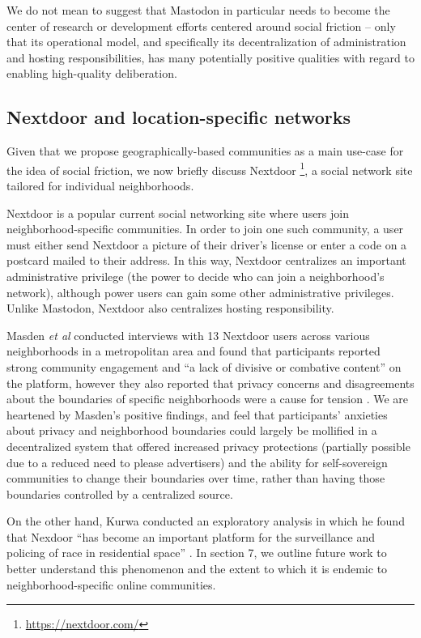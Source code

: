 \documentclass[sigconf,authordraft]{acmart}
\begin{document}
We do not mean to suggest that Mastodon in particular needs to become the center of research or development efforts centered around social friction -- only that its operational model, and specifically its decentralization of administration and hosting responsibilities, has many potentially positive qualities with regard to enabling high-quality deliberation.

\subsection{Nextdoor and location-specific networks}

Given that we propose geographically-based communities as a main use-case for the idea of social friction, we now briefly discuss Nextdoor \footnote{\url{https://nextdoor.com/}}, a social network site tailored for individual neighborhoods.

Nextdoor is a popular current social networking site where users join neighborhood-specific communities. In order to join one such community, a user must either send Nextdoor a picture of their driver's license or enter a code on a postcard mailed to their address. In this way, Nextdoor centralizes an important administrative privilege (the power to decide who can join a neighborhood's network), although power users can gain some other administrative privileges. Unlike Mastodon, Nextdoor also centralizes hosting responsibility.

Masden {\itshape et al} conducted interviews with 13 Nextdoor users across various neighborhoods in a metropolitan area and found that participants reported strong community engagement and ``a lack of divisive or combative content'' on the platform, however they also reported that privacy concerns and disagreements about the boundaries of specific neighborhoods were a cause for tension \cite{masden2014tensions}. We are heartened by Masden's positive findings, and feel that participants' anxieties about privacy and neighborhood boundaries could largely be mollified in a decentralized system that offered increased privacy protections (partially possible due to a reduced need to please advertisers) and the ability for self-sovereign communities to change their boundaries over time, rather than having those boundaries controlled by a centralized source.

On the other hand, Kurwa conducted an exploratory analysis in which he found that Nexdoor ``has become an important platform for the surveillance and policing of race in residential space'' \cite{kurwa2019building}. In section 7, we outline future work to better understand this phenomenon and the extent to which it is endemic to neighborhood-specific online communities.
\end{document}
